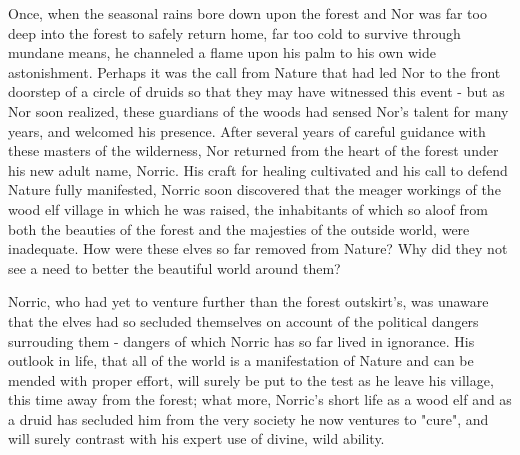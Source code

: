 Once, when the seasonal rains bore down upon the forest and Nor was far too deep into the forest to safely return home, far too cold to survive through mundane means, he channeled a flame upon his palm to his own wide astonishment. Perhaps it was the call from Nature that had led Nor to the front doorstep of a circle of druids so that they may have witnessed this event - but as Nor soon realized, these guardians of the woods had sensed Nor's talent for many years, and welcomed his presence. After several years of careful guidance with these masters of the wilderness, Nor returned from the heart of the forest under his new adult name, Norric. His craft for healing cultivated and his call to defend Nature fully manifested, Norric soon discovered that the meager workings of the wood elf village in which he was raised, the inhabitants of which so aloof from both the beauties of the forest and the majesties of the outside world, were inadequate. How were these elves so far removed from Nature? Why did they not see a need to better the beautiful world around them? 

Norric, who had yet to venture further than the forest outskirt's, was unaware that the elves had so secluded themselves on account of the political dangers surrouding them - dangers of which Norric has so far lived in ignorance. His outlook in life, that all of the world is a manifestation of Nature and can be mended with proper effort, will surely be put to the test as he leave his village, this time away from the forest; what more, Norric's short life as a wood elf and as a druid has secluded him from the very society he now ventures to "cure", and will surely contrast with his expert use of divine, wild ability.

